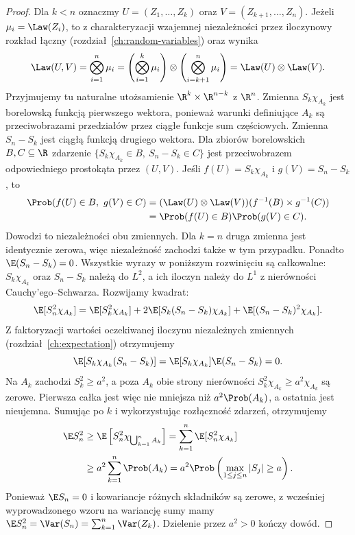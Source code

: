 \begin{proof}
Dla $k<n$ oznaczmy $U=(Z_1,\ldots,Z_k)$ oraz
$V=(Z_{k+1},\ldots,Z_n)$.
Jeżeli $\mu_i=\Law(Z_i)$, to z charakteryzacji wzajemnej
niezależności przez iloczynowy rozkład łączny
(rozdział~\ref{ch:random-variables}) oraz
wynika
\[
\Law(U,V)
=\bigotimes_{i=1}^n\mu_i
=\left(\bigotimes_{i=1}^k\mu_i\right)
 \otimes\left(\bigotimes_{i=k+1}^n\mu_i\right)
=\Law(U)\otimes\Law(V).
\]
Przyjmujemy tu naturalne utożsamienie
$\R^k\times\R^{n-k}$ z $\R^n$.
Zmienna $S_k\chi_{A_k}$ jest borelowską funkcją
pierwszego wektora, ponieważ warunki definiujące
$A_k$ są przeciwobrazami przedziałów przez ciągłe
funkcje sum częściowych. Zmienna $S_n-S_k$ jest
ciągłą funkcją drugiego wektora. Dla zbiorów
borelowskich $B,C\subseteq\R$ zdarzenie
$\{S_k\chi_{A_k}\in B,\ S_n-S_k\in C\}$ jest
przeciwobrazem odpowiedniego prostokąta przez $(U,V)$.
Jeśli $f(U)=S_k\chi_{A_k}$ i $g(V)=S_n-S_k$, to
\[
\begin{aligned}
\Prob(f(U)\in B,\ g(V)\in C)
&=(\Law(U)\otimes\Law(V))(f^{-1}(B)\times g^{-1}(C))\\
&=\Prob(f(U)\in B)\Prob(g(V)\in C).
\end{aligned}
\]
Dowodzi to niezależności obu zmiennych.
Dla $k=n$ druga zmienna jest identycznie zerowa,
więc niezależność zachodzi także w tym przypadku.
Ponadto $\E(S_n-S_k)=0$.
Wszystkie wyrazy w poniższym rozwinięciu są całkowalne:
$S_k\chi_{A_k}$ oraz $S_n-S_k$ należą do $L^2$,
a ich iloczyn należy do $L^1$ z nierówności
Cauchy'ego--Schwarza. Rozwijamy kwadrat:
\[
\E[S_n^2\chi_{A_k}]
=\E[S_k^2\chi_{A_k}]
+2\E[S_k(S_n-S_k)\chi_{A_k}]
+\E[(S_n-S_k)^2\chi_{A_k}].
\]
Z faktoryzacji wartości oczekiwanej iloczynu niezależnych
zmiennych (rozdział~\ref{ch:expectation}) otrzymujemy
\[
\E[S_k\chi_{A_k}(S_n-S_k)]
=\E[S_k\chi_{A_k}]\E(S_n-S_k)=0.
\]
Na $A_k$ zachodzi $S_k^2\geq a^2$, a poza $A_k$
obie strony nierówności
$S_k^2\chi_{A_k}\geq a^2\chi_{A_k}$ są zerowe.
Pierwsza całka jest więc nie mniejsza niż
$a^2\Prob(A_k)$, a ostatnia jest nieujemna.
Sumując po $k$ i wykorzystując rozłączność zdarzeń,
otrzymujemy
\[
\begin{aligned}
\E S_n^2
&\geq \E\left[S_n^2\chi_{\bigcup_{k=1}^n A_k}\right]
=\sum_{k=1}^n\E[S_n^2\chi_{A_k}]\\
&\geq a^2\sum_{k=1}^n\Prob(A_k)
=a^2\Prob\left(\max_{1\leq j\leq n}|S_j|\geq a\right).
\end{aligned}
\]
Ponieważ $\E S_n=0$ i kowariancje różnych składników
są zerowe, z wcześniej wyprowadzonego wzoru na
wariancję sumy mamy
$\E S_n^2=\Var(S_n)=\sum_{k=1}^n\Var(Z_k)$.
Dzielenie przez $a^2>0$ kończy dowód.
\end{proof}

